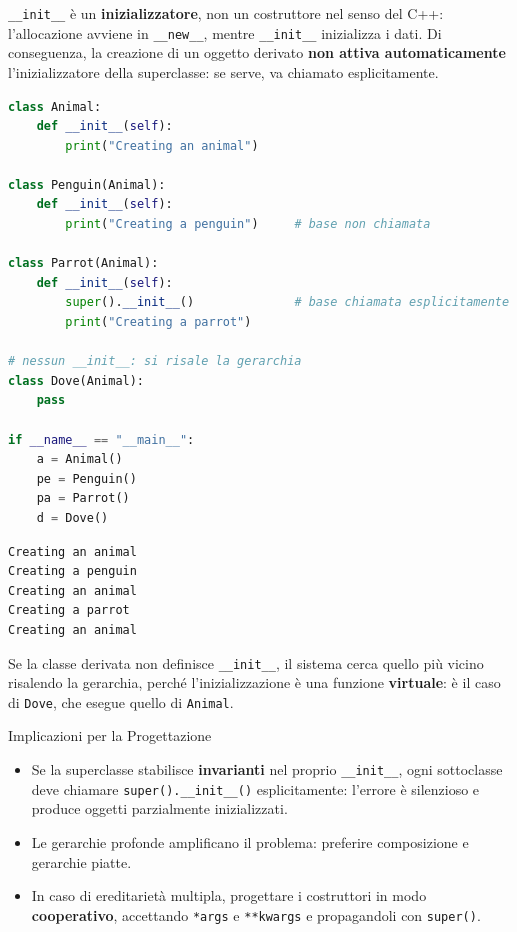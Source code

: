 \documentclass[12pt]{extarticle}
\begin{document}
\noindent \texttt{\_\_init\_\_} è un \textbf{inizializzatore}, non un costruttore nel senso del C++: l'allocazione avviene in \texttt{\_\_new\_\_}, mentre \texttt{\_\_init\_\_} inizializza i dati. Di conseguenza, la creazione di un oggetto derivato \textbf{non attiva automaticamente} l'inizializzatore della superclasse: se serve, va chiamato esplicitamente.

\begin{lstlisting}[language=Python]
class Animal:
    def __init__(self):
        print("Creating an animal")

class Penguin(Animal):
    def __init__(self):
        print("Creating a penguin")     # base non chiamata

class Parrot(Animal):
    def __init__(self):
        super().__init__()              # base chiamata esplicitamente
        print("Creating a parrot")

# nessun __init__: si risale la gerarchia
class Dove(Animal):
    pass

if __name__ == "__main__":
    a = Animal()
    pe = Penguin()
    pa = Parrot()
    d = Dove()
\end{lstlisting}

\begin{lstlisting}[numbers=none]
Creating an animal
Creating a penguin
Creating an animal
Creating a parrot
Creating an animal
\end{lstlisting}

\noindent Se la classe derivata non definisce \texttt{\_\_init\_\_}, il sistema cerca quello più vicino risalendo la gerarchia, perché l'inizializzazione è una funzione \textbf{virtuale}: è il caso di \texttt{Dove}, che esegue quello di \texttt{Animal}.

\begin{cbox}{Implicazioni per la Progettazione}
\begin{itemize}
    \item Se la superclasse stabilisce \textbf{invarianti} nel proprio \texttt{\_\_init\_\_}, ogni sottoclasse deve chiamare \texttt{super().\_\_init\_\_()} esplicitamente: l'errore è silenzioso e produce oggetti parzialmente inizializzati.
    \item Le gerarchie profonde amplificano il problema: preferire composizione e gerarchie piatte.
    \item In caso di ereditarietà multipla, progettare i costruttori in modo \textbf{cooperativo}, accettando \texttt{*args} e \texttt{**kwargs} e propagandoli con \texttt{super()}.
\end{itemize}
\end{cbox}
\end{document}
